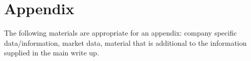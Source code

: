 %


\section*{Appendix}
The following materials are appropriate for an appendix: company specific data/information, market data, material that is additional to the information supplied in the main write up.

